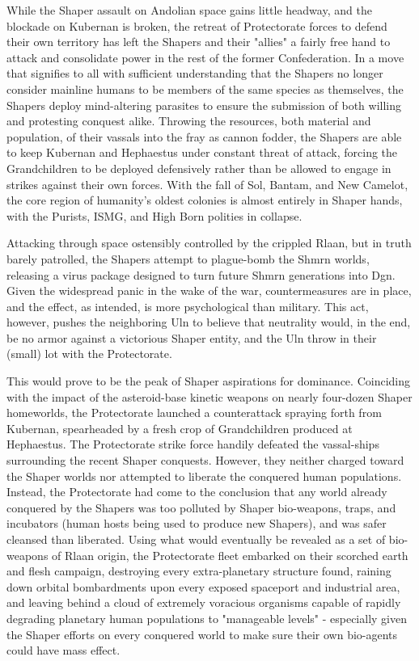 While the Shaper assault on Andolian space gains little headway, and
the blockade on Kubernan is broken, the retreat of Protectorate forces
to defend their own territory has left the Shapers and their "allies"
a fairly free hand to attack and consolidate power in the rest of the
former Confederation. In a move that signifies to all with sufficient
understanding that the Shapers no longer consider mainline humans to
be members of the same species as themselves, the Shapers deploy
mind-altering parasites to ensure the submission of both willing and
protesting conquest alike. Throwing the resources, both material and
population, of their vassals into the fray as cannon fodder, the
Shapers are able to keep Kubernan and Hephaestus under constant threat
of attack, forcing the Grandchildren to be deployed defensively rather
than be allowed to engage in strikes against their own forces. With
the fall of Sol, Bantam, and New Camelot, the core region of
humanity's oldest colonies is almost entirely in Shaper hands, with
the Purists, ISMG, and High Born polities in collapse.

Attacking through space ostensibly controlled by the crippled Rlaan,
but in truth barely patrolled, the Shapers attempt to plague-bomb the
Shmrn worlds, releasing a virus package designed to turn future Shmrn
generations into Dgn. Given the widespread panic in the wake of the
war, countermeasures are in place, and the effect, as intended, is
more psychological than military. This act, however, pushes the
neighboring Uln to believe that neutrality would, in the end, be no
armor against a victorious Shaper entity, and the Uln throw in their
(small) lot with the Protectorate.

This would prove to be the peak of Shaper aspirations for
dominance. Coinciding with the impact of the asteroid-base kinetic
weapons on nearly four-dozen Shaper homeworlds, the Protectorate
launched a counterattack spraying forth from Kubernan, spearheaded by
a fresh crop of Grandchildren produced at Hephaestus. The Protectorate
strike force handily defeated the vassal-ships surrounding the recent
Shaper conquests. However, they neither charged toward the Shaper
worlds nor attempted to liberate the conquered human
populations. Instead, the Protectorate had come to the conclusion that
any world already conquered by the Shapers was too polluted by Shaper
bio-weapons, traps, and incubators (human hosts being used to produce
new Shapers), and was safer cleansed than liberated. Using what would
eventually be revealed as a set of bio-weapons of Rlaan origin, the
Protectorate fleet embarked on their scorched earth and flesh
campaign, destroying every extra-planetary structure found, raining
down orbital bombardments upon every exposed spaceport and industrial
area, and leaving behind a cloud of extremely voracious organisms
capable of rapidly degrading planetary human populations to
"manageable levels" - especially given the Shaper efforts on every
conquered world to make sure their own bio-agents could have mass
effect.

